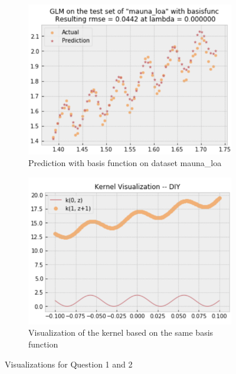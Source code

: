 \documentclass{article} %
\begin{document}
  \begin{figure}[!ht]
    \centering
    \begin{subfigure}[b]{0.48\linewidth}
      \includegraphics[width=\linewidth]{Q1.png}
      \caption{Prediction with basis function on dataset mauna\_loa}
    \end{subfigure}
    \begin{subfigure}[b]{0.48\linewidth}
      \includegraphics[width=\linewidth]{Q2.png}
      \caption{Visualization of the kernel based on the same basis function}
    \end{subfigure}
    \caption{Visualizations for Question 1 and 2}
    \label{fig:Q12}
  \end{figure}


\vspace{0.2cm}
\vspace{0.4cm}
\end{document}
